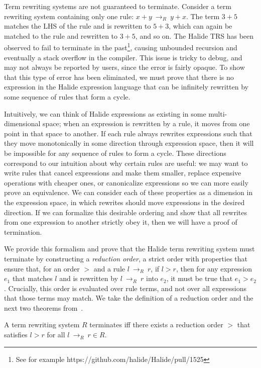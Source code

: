 \documentclass[acmsmall,review,anonymous]{acmart}\settopmatter{printfolios=true,printccs=false,printacmref=false}
\newcommand{\rewrites}[0]{\:\rightarrow_{R}\:}
\begin{document}
Term rewriting systems are not guaranteed to terminate. Consider a term
rewriting system containing only one rule: $x + y \rewrites y + x$. The term
$3 + 5$ matches the LHS of the rule and is rewritten to $5 + 3$, which can again
be matched to the rule and rewritten to $3 + 5$, and so on. The Halide TRS has been observed to fail to terminate in the past\footnote{See for example https://github.com/halide/Halide/pull/1525}, causing unbounded recursion and eventually a stack overflow in the compiler. This issue is tricky to debug, and may not always be reported by users, since the error is fairly opaque. To show that this type of error has been eliminated, we must prove that there is no expression in the Halide expression language that can be infinitely rewritten by some sequence of rules that form a cycle.

Intuitively, we can think of Halide expressions as existing in some multi-dimensional space; when an expression is rewritten by a rule, it moves from one point in that space to another. If each rule always rewrites expressions such that they move monotonically in some direction through expression space, then it will be impossible for any sequence of rules to form a cycle. These directions correspond to our intuition about why certain rules are useful: we may want to write rules that cancel expressions and make them smaller, replace expensive operations with cheaper ones, or canonicalize expressions so we can more easily prove an equivalence. We can consider each of these properties as a dimension in the expression space, in which rewrites should move expressions in the desired direction. If we can formalize this desirable ordering and show that all rewrites from one expression to another strictly obey it, then we will have a proof of termination.

We provide this formalism and prove that the Halide term rewriting system must terminate by constructing a \emph{reduction order}, a strict order with properties that ensure that, for an order $>$ and a rule $l \rewrites r$, if $l > r$, then for any expression $e_1$ that matches $l$ and is rewritten by $l \rewrites r$ into $e_2$, it must be true that $e_1 > e_2$. Crucially, this order is evaluated over rule terms, and not over all expressions that those terms may match. We take the definition of a reduction order and the next two theorems from~\citet{baader1999term}.

\begin{theorem}\label{theorem:terminates}
A term rewriting system $R$ terminates iff there exists a reduction order $>$ that satisfies $l > r$ for all $l \rewrites r \in R$.
\end{theorem}
\end{document}
